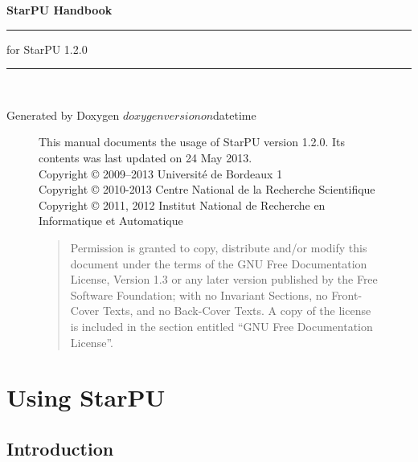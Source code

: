 \documentclass{book}
\begin{document}
\hypersetup{pageanchor=false,citecolor=blue}
\begin{titlepage}
\vspace*{4cm}
{\Huge \textbf{StarPU Handbook}}\\
\rule{\textwidth}{1.5mm}
\begin{flushright}
{\Large for StarPU 1.2.0}
\end{flushright}
\rule{\textwidth}{1mm}
~\\
\vspace*{15cm}
\begin{flushright}
Generated by Doxygen $doxygenversion on $datetime
\end{flushright}
\end{titlepage}

\begin{figure}[p]
This manual documents the usage of StarPU version 1.2.0. Its contents
was last updated on 24 May 2013.\\

Copyright © 2009–2013 Université de Bordeaux 1\\

Copyright © 2010-2013 Centre National de la Recherche Scientifique\\

Copyright © 2011, 2012 Institut National de Recherche en Informatique et Automatique\\

\medskip

\begin{quote}
Permission is granted to copy, distribute and/or modify this document
under the terms of the GNU Free Documentation License, Version 1.3 or
any later version published by the Free Software Foundation; with no
Invariant Sections, no Front-Cover Texts, and no Back-Cover Texts. A
copy of the license is included in the section entitled “GNU Free
Documentation License”.
\end{quote}
\end{figure}

\clearemptydoublepage
{}
\tableofcontents
\clearemptydoublepage
{}
\hypersetup{pageanchor=true,citecolor=blue}

\part{Using StarPU}

\chapter{Introduction}
\label{index}
\hypertarget{index}{}

\end{document}
